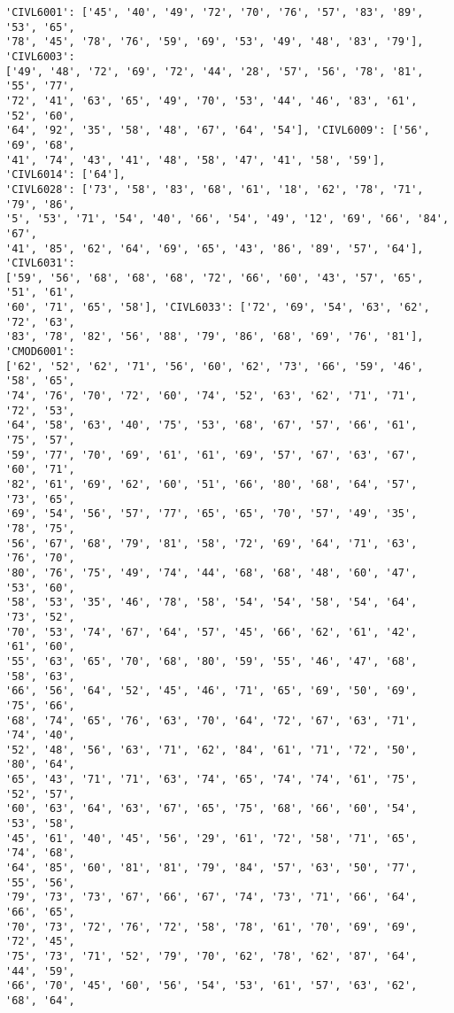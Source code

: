 \documentclass[11pt]{article}
\begin{document}
\begin{Verbatim}[commandchars=\\\{\}]
'CIVL6001': ['45', '40', '49', '72', '70', '76', '57', '83', '89', '53', '65',
'78', '45', '78', '76', '59', '69', '53', '49', '48', '83', '79'], 'CIVL6003':
['49', '48', '72', '69', '72', '44', '28', '57', '56', '78', '81', '55', '77',
'72', '41', '63', '65', '49', '70', '53', '44', '46', '83', '61', '52', '60',
'64', '92', '35', '58', '48', '67', '64', '54'], 'CIVL6009': ['56', '69', '68',
'41', '74', '43', '41', '48', '58', '47', '41', '58', '59'], 'CIVL6014': ['64'],
'CIVL6028': ['73', '58', '83', '68', '61', '18', '62', '78', '71', '79', '86',
'5', '53', '71', '54', '40', '66', '54', '49', '12', '69', '66', '84', '67',
'41', '85', '62', '64', '69', '65', '43', '86', '89', '57', '64'], 'CIVL6031':
['59', '56', '68', '68', '68', '72', '66', '60', '43', '57', '65', '51', '61',
'60', '71', '65', '58'], 'CIVL6033': ['72', '69', '54', '63', '62', '72', '63',
'83', '78', '82', '56', '88', '79', '86', '68', '69', '76', '81'], 'CMOD6001':
['62', '52', '62', '71', '56', '60', '62', '73', '66', '59', '46', '58', '65',
'74', '76', '70', '72', '60', '74', '52', '63', '62', '71', '71', '72', '53',
'64', '58', '63', '40', '75', '53', '68', '67', '57', '66', '61', '75', '57',
'59', '77', '70', '69', '61', '61', '69', '57', '67', '63', '67', '60', '71',
'82', '61', '69', '62', '60', '51', '66', '80', '68', '64', '57', '73', '65',
'69', '54', '56', '57', '77', '65', '65', '70', '57', '49', '35', '78', '75',
'56', '67', '68', '79', '81', '58', '72', '69', '64', '71', '63', '76', '70',
'80', '76', '75', '49', '74', '44', '68', '68', '48', '60', '47', '53', '60',
'58', '53', '35', '46', '78', '58', '54', '54', '58', '54', '64', '73', '52',
'70', '53', '74', '67', '64', '57', '45', '66', '62', '61', '42', '61', '60',
'55', '63', '65', '70', '68', '80', '59', '55', '46', '47', '68', '58', '63',
'66', '56', '64', '52', '45', '46', '71', '65', '69', '50', '69', '75', '66',
'68', '74', '65', '76', '63', '70', '64', '72', '67', '63', '71', '74', '40',
'52', '48', '56', '63', '71', '62', '84', '61', '71', '72', '50', '80', '64',
'65', '43', '71', '71', '63', '74', '65', '74', '74', '61', '75', '52', '57',
'60', '63', '64', '63', '67', '65', '75', '68', '66', '60', '54', '53', '58',
'45', '61', '40', '45', '56', '29', '61', '72', '58', '71', '65', '74', '68',
'64', '85', '60', '81', '81', '79', '84', '57', '63', '50', '77', '55', '56',
'79', '73', '73', '67', '66', '67', '74', '73', '71', '66', '64', '66', '65',
'70', '73', '72', '76', '72', '58', '78', '61', '70', '69', '69', '72', '45',
'75', '73', '71', '52', '79', '70', '62', '78', '62', '87', '64', '44', '59',
'66', '70', '45', '60', '56', '54', '53', '61', '57', '63', '62', '68', '64',

\end{Verbatim}
\end{document}
